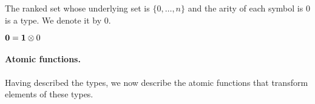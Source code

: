 \begin{example}
The ranked set whose underlying set is $\{0,\dots,n\}$ and the arity of each symbol is $0$ is a type. We denote it by $0$. 
\end{example}

\begin{example}
$\mathbf{0}=\mathbf{1}\otimes 0$
\end{example}

\paragraph*{Atomic functions.} Having described the types, we now describe the atomic functions that transform elements of these types.




